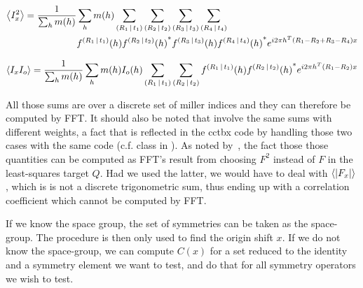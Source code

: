 \documentclass[11pt]{article}
\begin{document}
\begin{equation}
\begin{split}
\left\langle I_x^2 \right\rangle = \frac{1}{\sum_h m(h)}&\sum_h m(h) \sum_{\left( R_1\,\vert\, t_1 \right)} \sum_{\left( R_2\,\vert\, t_2 \right)} \sum_{\left( R_3\,\vert\, t_3 \right)} \sum_{\left( R_4\,\vert\, t_4 \right)} \\
&f^{\left( R_1\,\vert\, t_1 \right)}(h) {f^{\left( R_2\,\vert\, t_2 \right)}(h)}^* f^{\left( R_3\,\vert\, t_3 \right)}(h) {f^{\left( R_4\,\vert\, t_4 \right)}(h)}^* e^{i2\pi h^T (R_1 - R_2 + R_3 - R_4)x}
\end{split}
\label{eqn:meanIxsq}
\end{equation}

\begin{equation}
\left\langle I_x I_o \right\rangle = \frac{1}{\sum_h m(h)}\sum_h m(h)  I_o(h) \sum_{\left( R_1\,\vert\, t_1 \right)} \sum_{\left( R_2\,\vert\, t_2 \right)} f^{\left( R_1\,\vert\, t_1 \right)}(h) {f^{\left( R_2\,\vert\, t_2 \right)}(h)}^* e^{i2\pi h^T (R_1 - R_2)x}
\label{eqn:meanIxIo}
\end{equation}

All those sums are over a discrete set of miller indices and they can therefore be computed by FFT. It should also be noted that  involve the same sums with different weights, a fact that is reflected in the cctbx code by handling those two cases with the same code (c.f. class  in ). As noted by~\cite{J.Navaza:1995}, the fact those those quantities can be computed as FFT's result from choosing $F^2$ instead of $F$ in the least-squares target $Q$. Had we used the latter, we would have to deal with $\left\langle |F_x| \right\rangle$, which is is not a discrete trigonometric sum, thus ending up with a correlation coefficient which cannot be computed by FFT.

If we know the space group, the set of symmetries can be taken as the space-group. The procedure is then only used to find the origin shift $x$. If we do not know the space-group, we can compute $C(x)$ for a set reduced to the identity and a symmetry element we want to test, and do that for all symmetry operators we wish to test.


\end{document}
